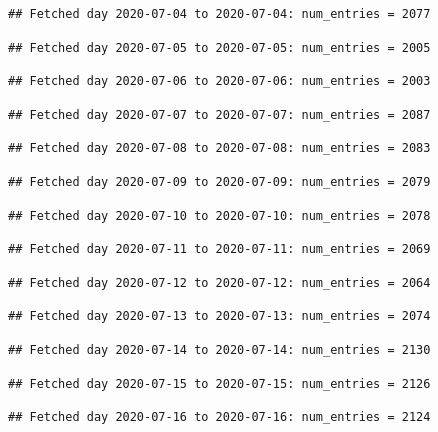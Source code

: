 \documentclass[]{article}
\begin{document}
\begin{verbatim}
## Fetched day 2020-07-04 to 2020-07-04: num_entries = 2077
\end{verbatim}

\begin{verbatim}
## Fetched day 2020-07-05 to 2020-07-05: num_entries = 2005
\end{verbatim}

\begin{verbatim}
## Fetched day 2020-07-06 to 2020-07-06: num_entries = 2003
\end{verbatim}

\begin{verbatim}
## Fetched day 2020-07-07 to 2020-07-07: num_entries = 2087
\end{verbatim}

\begin{verbatim}
## Fetched day 2020-07-08 to 2020-07-08: num_entries = 2083
\end{verbatim}

\begin{verbatim}
## Fetched day 2020-07-09 to 2020-07-09: num_entries = 2079
\end{verbatim}

\begin{verbatim}
## Fetched day 2020-07-10 to 2020-07-10: num_entries = 2078
\end{verbatim}

\begin{verbatim}
## Fetched day 2020-07-11 to 2020-07-11: num_entries = 2069
\end{verbatim}

\begin{verbatim}
## Fetched day 2020-07-12 to 2020-07-12: num_entries = 2064
\end{verbatim}

\begin{verbatim}
## Fetched day 2020-07-13 to 2020-07-13: num_entries = 2074
\end{verbatim}

\begin{verbatim}
## Fetched day 2020-07-14 to 2020-07-14: num_entries = 2130
\end{verbatim}

\begin{verbatim}
## Fetched day 2020-07-15 to 2020-07-15: num_entries = 2126
\end{verbatim}

\begin{verbatim}
## Fetched day 2020-07-16 to 2020-07-16: num_entries = 2124
\end{verbatim}
\end{document}

